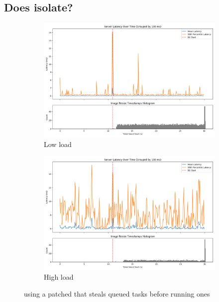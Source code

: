 \subsection{Does \schedbe{} isolate?}

\begin{figure}[t]
    \centering
    \begin{subfigure}[t]{0.49\columnwidth}
        \includegraphics[width=\columnwidth]{graphs/srv-bg-schedbe-low.png}
        \caption{Low load}\label{fig:srv-bg-schedbe-low}
    \end{subfigure}
    \hspace{\fill}
    \begin{subfigure}[t]{0.49\columnwidth}
        \includegraphics[width=\columnwidth]{graphs/srv-bg-schedbe-high.png}
        \caption{High load}\label{fig:srv-bg-schedbe-high}
    \end{subfigure}
    \vspace{4pt}
    \caption{using a patched \schedidle{} that steals queued \schednormal{}
    tasks before running \schedidle{} ones}\label{fig:srv-bg-schedbe}
\end{figure}


